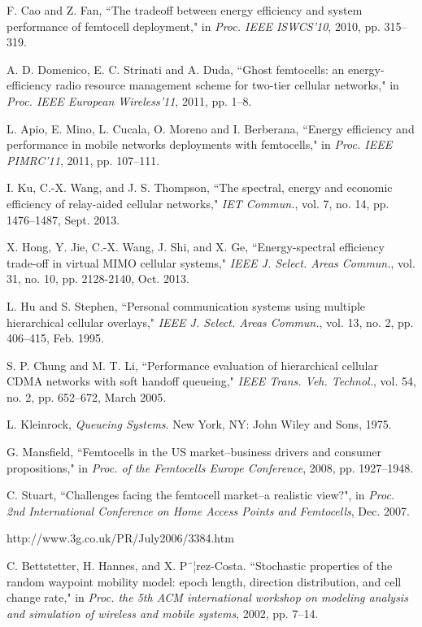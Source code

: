 \documentclass[10pt,final,journal,letterpaper,twoside,twocolumn]{IEEEtran}
\begin{document}
\begin{thebibliography}{1}
    F. Cao and Z. Fan, ``The tradeoff between energy efficiency and system performance of femtocell deployment," in {\em Proc. IEEE ISWCS'10}, 2010, pp. 315--319.

    A. D. Domenico, E. C. Strinati and A. Duda, ``Ghost femtocells: an energy-efficiency radio resource management scheme for two-tier cellular networks," in {\em Proc. IEEE European Wireless'11}, 2011, pp. 1--8.

L. Apio, E. Mino, L. Cucala, O. Moreno and I. Berberana, ``Energy efficiency
and performance in mobile networks deployments with femtocells," in {\em
Proc. IEEE PIMRC'11}, 2011, pp. 107--111.

I. Ku, C.-X. Wang, and J. S. Thompson, ``The spectral, energy and economic efficiency of relay-aided cellular networks," {\em IET Commun.}, vol. 7, no. 14, pp. 1476--1487, Sept. 2013.

X. Hong, Y. Jie, C.-X. Wang, J. Shi, and X. Ge, ``Energy-spectral efficiency trade-off in virtual MIMO cellular systems," {\em IEEE J. Select. Areas Commun.}, vol. 31, no. 10, pp. 2128-2140, Oct. 2013.

L. Hu and S. Stephen, ``Personal communication systems using multiple hierarchical cellular overlays," {\em IEEE J. Select. Areas Commun.}, vol. 13, no. 2, pp. 406--415, Feb. 1995.

S. P. Chung and M. T. Li, ``Performance evaluation of hierarchical cellular CDMA networks with soft handoff queueing," {\em IEEE Trans. Veh. Technol.}, vol. 54, no. 2, pp. 652--672, March 2005.

L. Kleinrock, {\em Queueing Systems}. New York, NY: John Wiley and Sons,
1975.

G. Mansfield, ``Femtocells in the US market--business drivers and consumer propositions," in {\em Proc. of the Femtocells Europe Conference}, 2008, pp. 1927--1948.

C. Stuart, ``Challenges facing the femtocell market--a
realistic view?", in {\em Proc. 2nd International Conference on Home Access
Points and Femtocells}, Dec. 2007.

    http://www.3g.co.uk/PR/July2006/3384.htm

C. Bettstetter, H. Hannes, and X. P¨¦rez-Costa. ``Stochastic properties of the random waypoint mobility model: epoch length, direction distribution, and cell change rate," in {\em Proc. the 5th ACM international workshop on modeling analysis and simulation of wireless and mobile systems}, 2002, pp. 7--14.


\end{thebibliography}
\end{document}
